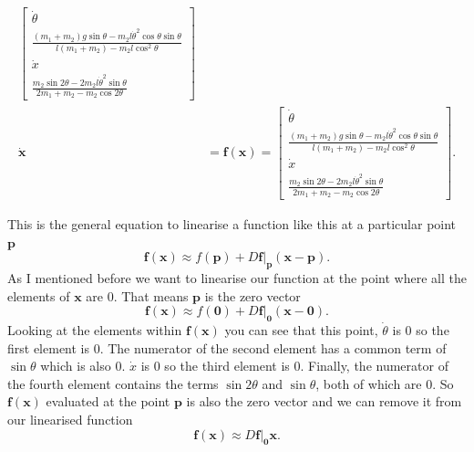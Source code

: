 \documentclass{article}
\renewcommand{\vec}[1]{\boldsymbol{\mathbf{#1}}}
\newcommand{\dvec}[1]{\dot{\vec{#1}}}
\begin{document}
\begin{align*}
\begin{bmatrix}
                                         \dot{\theta}                                                                                                         \\
                                         \frac{(m_1 + m_2) g \sin \theta - m_2 l \dot{\theta}^2 \cos \theta \sin \theta}{l (m_1 + m_2) - m_2 l \cos^2 \theta} \\
                                         \dot{x}                                                                                                              \\
                                         \frac{m_2 \sin 2 \theta - 2 m_2 l \dot{\theta}^2 \sin \theta}{2 m_1 + m_2 - m_2 \cos 2 \theta}
                                       \end{bmatrix}    \\
  \dvec{x}         & = \vec{f}(\vec{x}) = \begin{bmatrix}
                                            \dot{\theta}                                                                                                         \\
                                            \frac{(m_1 + m_2) g \sin \theta - m_2 l \dot{\theta}^2 \cos \theta \sin \theta}{l (m_1 + m_2) - m_2 l \cos^2 \theta} \\
                                            \dot{x}                                                                                                              \\
                                            \frac{m_2 \sin 2 \theta - 2 m_2 l \dot{\theta}^2 \sin \theta}{2 m_1 + m_2 - m_2 \cos 2 \theta}
                                          \end{bmatrix}.
\end{align*}

This is the general equation to linearise a function like this at a particular point $\vec{p}$ \[\vec{f}(\vec{x}) \approx f(\vec{p}) + D \vec{f}|_{\vec{p}} (\vec{x} - \vec{p}).\] As I mentioned before we want to linearise our function at the point where all the elements of $\vec{x}$ are $0$. That means $\vec{p}$ is the zero vector \[\vec{f}(\vec{x}) \approx f(\vec{0}) + D \vec{f}|_{\vec{0}} (\vec{x} - \vec{0}).\] Looking at the elements within $\vec{f}(\vec{x})$ you can see that this point, $\dot{\theta}$ is $0$ so the first element is $0$. The numerator of the second element has a common term of $\sin \theta$ which is also $0$. $\dot{x}$ is $0$ so the third element is $0$. Finally, the numerator of the fourth element contains the terms $\sin 2 \theta$ and $\sin \theta$, both of which are $0$. So $\vec{f}(\vec{x})$ evaluated at the point $\vec{p}$ is also the zero vector and we can remove it from our linearised function \[\vec{f}(\vec{x}) \approx D \vec{f}|_{\vec{0}} \vec{x}.\]
\end{document}
